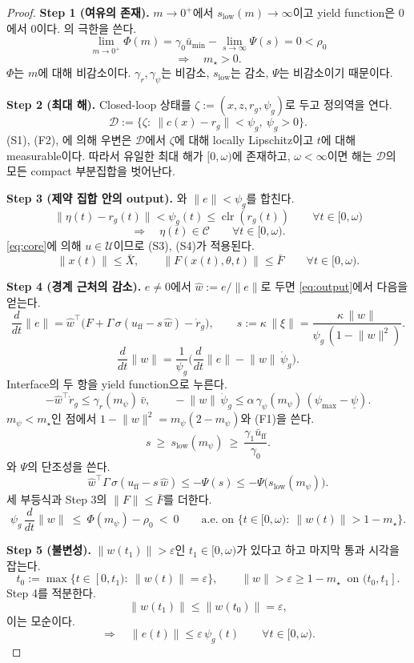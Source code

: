 \documentclass[11pt]{article}\usepackage[margin=1in]{geometry}\usepackage{amsmath,amssymb,amsthm,mathtools}\usepackage{graphicx}\graphicspath{{figures/}{../figures/}{figs/}{./}}\usepackage{enumitem}\usepackage{hyperref}\usepackage{cleveref}\usepackage{tikz}\usetikzlibrary{arrows.meta,positioning,calc,shapes.geometric}\usepackage{float}\usepackage[most]{tcolorbox}\usepackage{kotex}\usepackage{booktabs}\emergencystretch=1.6em\tolerance=2000 \crefname{assumption}{Assumption}{Assumptions}\Crefname{assumption}{Assumption}{Assumptions}\crefname{definition}{Definition}{Definitions}\Crefname{definition}{Definition}{Definitions}\crefname{proposition}{Proposition}{Propositions}\Crefname{proposition}{Proposition}{Propositions}\crefname{fact}{Fact}{Facts}\Crefname{fact}{Fact}{Facts} \newtheorem{assumption}{Assumption}\newtheorem{definition}{Definition}\newtheorem{lemma}{Lemma}\newtheorem{proposition}{Proposition}\newtheorem{theorem}{Theorem}\newtheorem{corollary}{Corollary}\newtheorem{fact}{Fact}\theoremstyle{remark}\newtheorem{remark}{Remark} \newcommand{\R}{\mathbb{R}}\newcommand{\U}{\mathcal U}
\newcommand{\Cset}{\mathcal C}\newcommand{\Pcl}{\mathcal P}\newcommand{\Zset}{\mathcal Z_0}\newcommand{\Xset}{\mathcal X_0}
\DeclareMathOperator{\clr}{clr}\newcommand{\norm}[1]{\lVert #1\rVert}\newcommand{\what}{\hat w}
\begin{document}
\begin{proof}
\textbf{Step 1 (여유의 존재).} $m\to0^+$에서 $s_{\mathrm{low}}(m)\to\infty$이고 yield function은 0에서 0이다. 의 극한을 쓴다.
\[
\lim_{m\to0^+}\Phi(m)=\gamma_0\bar u_{\min}-\lim_{s\to\infty}\Psi(s)=0<\rho_0
\]
\[
\Longrightarrow\quad m_\star>0 .
\]
$\Phi$는 $m$에 대해 비감소이다. $\gamma_r,\gamma_\psi$는 비감소, $s_{\mathrm{low}}$는 감소, $\Psi$는 비감소이기 때문이다.

\textbf{Step 2 (최대 해).} Closed-loop 상태를 $\zeta:=(x,z,r_g,\psi_g)$로 두고 정의역을 연다.
\[
\mathcal D:=\{\zeta:\ \norm{c(x)-r_g}<\psi_g,\ \psi_g>0\}.
\]
(S1), (F2), 에 의해 우변은 $\mathcal D$에서 $\zeta$에 대해 locally Lipschitz이고 $t$에 대해 measurable이다. 따라서 유일한 최대 해가 $[0,\omega)$에 존재하고, $\omega<\infty$이면 해는 $\mathcal D$의 모든 compact 부분집합을 벗어난다.

\textbf{Step 3 (제약 집합 안의 output).} 와 $\norm{e}<\psi_g$를 합친다.
\[
\norm{\eta(t)-r_g(t)}<\psi_g(t)\le\clr(r_g(t))\qquad\forall t\in[0,\omega)
\]
\[
\Longrightarrow\quad \eta(t)\in\Cset\qquad\forall t\in[0,\omega).
\]
\eqref{eq:core}에 의해 $u\in\U$이므로 (S3), (S4)가 적용된다.
\[
\norm{x(t)}\le\bar X,\qquad \norm{F(x(t),\theta,t)}\le\bar F\qquad\forall t\in[0,\omega).
\]

\textbf{Step 4 (경계 근처의 감소).} $e\ne0$에서 $\what:=e/\norm{e}$로 두면 \eqref{eq:output}에서 다음을 얻는다.
\[
\frac{d}{dt}\norm{e}=\what^\top\big(F+\Gamma\,\sigma(u_{\mathrm{ff}}-s\,\what)-\dot r_g\big),\qquad s:=\kappa\,\norm{\xi}=\frac{\kappa\,\norm{w}}{\psi_g\,(1-\norm{w}^2)} .
\]
\[
\frac{d}{dt}\norm{w}=\frac{1}{\psi_g}\Big(\frac{d}{dt}\norm{e}-\norm{w}\,\dot\psi_g\Big).
\]
Interface의 두 항을 yield function으로 누른다.
\[
-\what^\top\dot r_g\le\gamma_r(m_\psi)\,\bar v,\qquad -\norm{w}\,\dot\psi_g\le\alpha\,\gamma_\psi(m_\psi)\,(\psi_{\max}-\underline\psi).
\]
$m_\psi<m_\star$인 점에서 $1-\norm{w}^2=m_\psi(2-m_\psi)$와 (F1)을 쓴다.
\[
s\ \ge\ s_{\mathrm{low}}(m_\psi)\ \ge\ \frac{\gamma_1\bar u_{\mathrm{ff}}}{\gamma_0}.
\]
와 $\Psi$의 단조성을 쓴다.
\[
\what^\top\Gamma\,\sigma(u_{\mathrm{ff}}-s\,\what)\le-\Psi(s)\le-\Psi\big(s_{\mathrm{low}}(m_\psi)\big).
\]
세 부등식과 Step 3의 $\norm{F}\le\bar F$를 더한다.
\[
\psi_g\,\frac{d}{dt}\norm{w}\ \le\ \Phi(m_\psi)-\rho_0\ <\ 0\qquad\text{a.e. on }\{t\in[0,\omega):\ \norm{w(t)}>1-m_\star\}.
\]

\textbf{Step 5 (불변성).} $\norm{w(t_1)}>\varepsilon$인 $t_1\in[0,\omega)$가 있다고 하고 마지막 통과 시각을 잡는다.
\[
t_0:=\max\{t\in[0,t_1):\ \norm{w(t)}=\varepsilon\},\qquad \norm{w}>\varepsilon\ge1-m_\star\ \text{ on }(t_0,t_1].
\]
Step 4를 적분한다.
\[
\norm{w(t_1)}\le\norm{w(t_0)}=\varepsilon ,
\]
이는 모순이다.
\[
\Longrightarrow\quad \norm{e(t)}\le\varepsilon\,\psi_g(t)\qquad\forall t\in[0,\omega).
\]


\end{proof}
\end{document}
